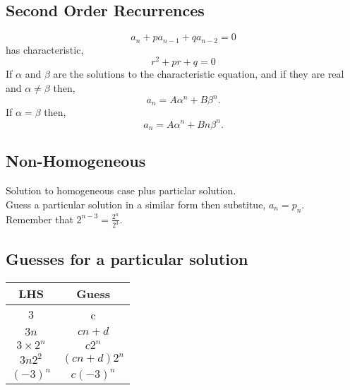 \documentclass[a4paper,10pt]{article}
\begin{document}
\subsection*{Second Order Recurrences}
$$a_n + pa_{n-1} + qa_{n-2} = 0$$
has characteristic,
$$r^2 + pr + q = 0$$
If $\alpha$ and $\beta$ are the solutions to the characteristic equation, and if they are real and $\alpha \ne \beta$ then,
$$a_n = A\alpha^n + B\beta^n.$$
If $\alpha = \beta$ then,
$$a_n = A\alpha^n + Bn\beta^n.$$

\subsection*{Non-Homogeneous}
Solution to homogeneous case plus particlar solution.\\
Guess a particular solution in a similar form then substitue, $a_n = p_n$.\\
Remember that $2^{n-3}=\frac{2^n}{2^3}$.

\subsection*{Guesses for a particular solution}
\begin{tabular}{c|c}%
 LHS & Guess \\ \hline
$3$ & c \\
$3n$ & $cn + d$\\
$3\times 2^n$ & $c2^n$\\
$3n2^2$ & $(cn+d)2^n$\\
$(-3)^n$ & $c(-3)^n$\\
\end{tabular} 
\end{document}
